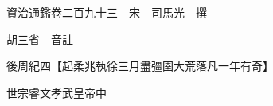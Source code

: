 










 


 
 


 

  
  
  
  
  





  
  
  
  
  
 
  

  

  
  
  



  

 
 

  
   




  

  
  


  　　資治通鑑卷二百九十三　宋　司馬光　撰

　　胡三省　音註

　　後周紀四【起柔兆執徐三月盡彊圉大荒落凡一年有奇】

　　世宗睿文孝武皇帝中

